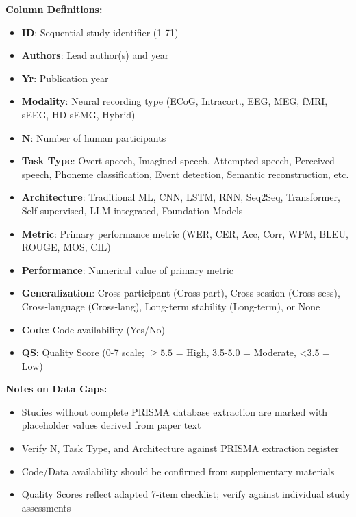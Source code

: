 \documentclass[11pt,a4paper]{article}
\begin{document}
\vspace{2cm}

\textbf{Column Definitions:}
\begin{itemize}
    \item \textbf{ID}: Sequential study identifier (1-71)
    \item \textbf{Authors}: Lead author(s) and year
    \item \textbf{Yr}: Publication year
    \item \textbf{Modality}: Neural recording type (ECoG, Intracort., EEG, MEG, fMRI, sEEG, HD-sEMG, Hybrid)
    \item \textbf{N}: Number of human participants
    \item \textbf{Task Type}: Overt speech, Imagined speech, Attempted speech, Perceived speech, Phoneme classification, Event detection, Semantic reconstruction, etc.
    \item \textbf{Architecture}: Traditional ML, CNN, LSTM, RNN, Seq2Seq, Transformer, Self-supervised, LLM-integrated, Foundation Models
    \item \textbf{Metric}: Primary performance metric (WER, CER, Acc, Corr, WPM, BLEU, ROUGE, MOS, CIL)
    \item \textbf{Performance}: Numerical value of primary metric
    \item \textbf{Generalization}: Cross-participant (Cross-part), Cross-session (Cross-sess), Cross-language (Cross-lang), Long-term stability (Long-term), or None
    \item \textbf{Code}: Code availability (Yes/No)
    \item \textbf{QS}: Quality Score (0-7 scale; $\geq 5.5$ = High, 3.5-5.0 = Moderate, <3.5 = Low)
\end{itemize}

\vspace{1cm}

\textbf{Notes on Data Gaps:}
\begin{itemize}
    \item Studies without complete PRISMA database extraction are marked with placeholder values derived from paper text
    \item Verify N, Task Type, and Architecture against PRISMA extraction register
    \item Code/Data availability should be confirmed from supplementary materials
    \item Quality Scores reflect adapted 7-item checklist; verify against individual study assessments
\end{itemize}
\end{document}
